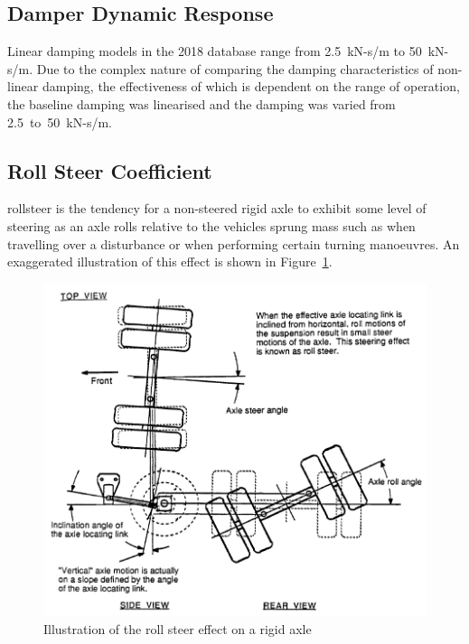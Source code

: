 \subsection{Damper Dynamic Response}\label{section:pr-axle-damper}

Linear damping models in the \trucksim{} 2018 database range from 2.5~kN-s/m to 50~kN-s/m. Due to the complex nature of comparing the damping characteristics of non-linear damping, the effectiveness of which is dependent on the range of operation, the baseline damping was linearised and the damping was varied from 2.5~to~50~kN-s/m.

\subsection{Roll Steer Coefficient}\label{section:pr-roll-steer}

\gls{rollsteer} is the tendency for a non-steered rigid axle to exhibit some level of steering as an axle rolls relative to the vehicles sprung mass such as when travelling over a disturbance or when performing certain turning manoeuvres. An exaggerated illustration of this effect is shown in Figure~\ref{figure:Illustration-of-the-roll-steer-effect-on-a-rigid-axle}.

\begin{figure}[!htbp]
	\centering
	\includegraphics[width=1\textwidth]{fig/fancher-1986_roll-steer-illustration}
	\caption{Illustration of the roll steer effect on a rigid axle \cite{Fancher1986}}
	\label{figure:Illustration-of-the-roll-steer-effect-on-a-rigid-axle}
\end{figure}

